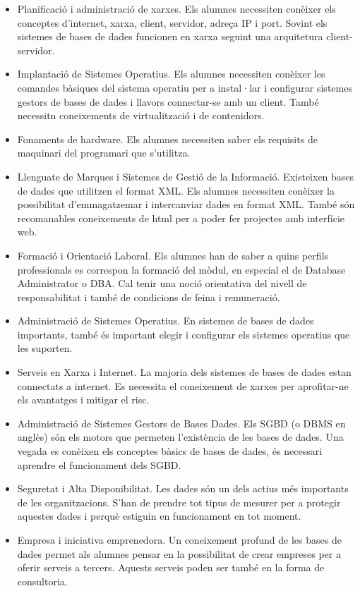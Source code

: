 \documentclass[catalan, a4paper, 12pt, titlepage]{article}
\begin{document}
\begin{itemize}
	\item Planificació i administració de xarxes. Els alumnes necessiten conèixer els conceptes d'internet, xarxa, client, servidor, adreça IP i port. Sovint els sistemes de bases de dades funcionen en xarxa seguint una arquitetura client-servidor.
	\item Implantació de Sistemes Operatius. Els alumnes necessiten conèixer les comandes bàsiques del sistema operatiu per a instal·lar i configurar sistemes gestors de bases de dades i llavors connectar-se amb un client. També necessitn coneixements de virtualització i de contenidors.
	\item Fonaments de hardware. Els alumnes necessiten saber els requisits de maquinari del programari que s'utilitza.
	\item Llenguate de Marques i Sistemes de Gestió de la Informació. Existeixen bases de dades que utilitzen el format XML. Els alumnes necessiten conèixer la possibilitat d'emmagatzemar i intercanviar dades en format XML. També són recomanables coneixements de html per a poder fer projectes amb interfície web.
	\item Formació i Orientació Laboral. Els alumnes han de saber a quins perfils professionals es correspon la formació del mòdul, en especial el de Database Administrator o DBA. Cal tenir una noció orientativa del nivell de responsabilitat i també de condicions de feina i remuneració.
	\item Administració de Sistemes Operatius. En sistemes de bases de dades importants, també és important elegir i configurar els sistemes operatius que les suporten.
	\item Serveis en Xarxa i Internet. La majoria dels sistemes de bases de dades estan connectats a internet. Es necessita el coneixement de xarxes per aprofitar-ne els avantatges i mitigar el risc.
	\item Administració de Sistemes Gestors de Bases Dades. Els SGBD (o DBMS en anglès) són els motors que permeten l'existència de les bases de dades. Una vegada es conèixen els conceptes bàsics de bases de dades, és necessari aprendre el funcionament dels SGBD.
	\item Seguretat i Alta Disponibilitat. Les dades són un dels actius més importants de les organitzacions. S'han de prendre tot tipus de mesurer per a protegir aquestes dades i perquè estiguin en funcionament en tot moment.
	\item Empresa i iniciativa emprenedora. Un coneixement profund de les bases de dades permet als alumnes pensar en la possibilitat de crear empreses per a oferir serveis a tercers. Aquests serveis poden ser també en la forma de consultoria.
\end{itemize}
\end{document}
